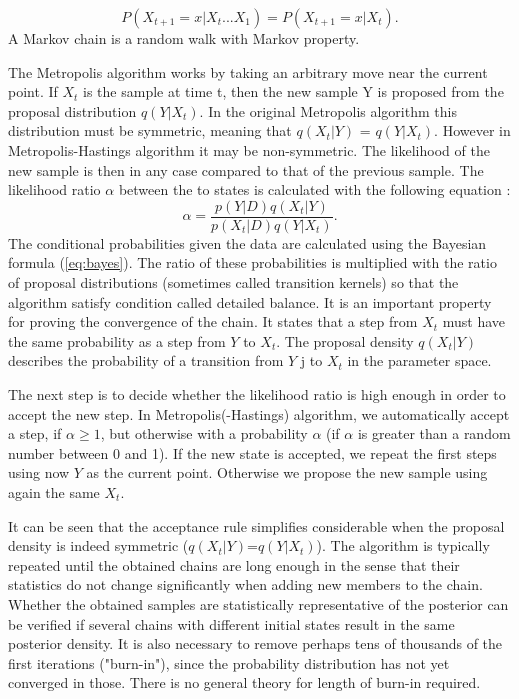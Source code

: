\documentclass{wihuri}
\def\be{\begin{equation}}
\def\ee{\end{equation}}
\begin{document}
 \be \label{eq:markov_prop}
P(X_{t+1} = x|X_{t}. . . X_{1}) = P(X_{t+1} = x|X_{t}).
\ee
A Markov chain is a random walk with Markov property.
 
The Metropolis algorithm works by taking an arbitrary move near the current
point. If $X_{t}$ is the sample at time t, then the new sample Y is proposed from the proposal distribution $q(Y|X_{t})$. In the original Metropolis algorithm this distribution must be symmetric, meaning that $q(X_{t}|Y)$ = $q(Y|X_{t})$. However in Metropolis-Hastings algorithm it may be non-symmetric. The likelihood of the new sample is then in any case compared to that of the previous sample. The likelihood ratio $\alpha$ between the to states is calculated with the following equation \cite{tuomi}:
\be \label{eq:likely_ratio} 
\alpha = \frac{p(Y|D)q(X_{t}|Y)}{p(X_{t}|D)q(Y|X_{t})}.
\ee
The conditional probabilities given the data are calculated using the Bayesian formula (\ref{eq:bayes}). The ratio of these probabilities is multiplied with the ratio of proposal distributions (sometimes called transition kernels) so that the algorithm satisfy condition called detailed balance. It is an important property for proving the convergence of the chain. It states that a step from $X_{t}$ must have the same probability as a step from $Y$ to $X_{t}$.  The proposal density $q(X_{t}|Y)$ describes the probability of a transition from $Y$ j to $X_{t}$ in the parameter space.

The next step is to decide whether the likelihood ratio is high enough in order to accept the new step. In Metropolis(-Hastings) algorithm, we automatically accept a step, if $\alpha \ge 1$, but otherwise with a probability $\alpha$ (if $\alpha$ is greater than a random number between 0 and 1). If the new state is accepted, we repeat the first steps using now $Y$ as the current point. Otherwise we propose the new sample using again the same $X_{t}$. 



It can be seen that the acceptance rule simplifies considerable when the
proposal density is indeed symmetric ($q(X_{t}|Y)$=$q(Y|X_{t})$). The algorithm is typically repeated until the obtained chains are long enough in the sense that their statistics do not change significantly when adding new members to the chain. Whether the obtained samples are statistically representative of the posterior can be verified if several chains with different initial states result in the same posterior density. It is also necessary to remove perhaps tens of thousands of the first iterations ("burn-in"), since the probability distribution has not yet converged in those. There is no general theory for length of burn-in required. 
\end{document}
